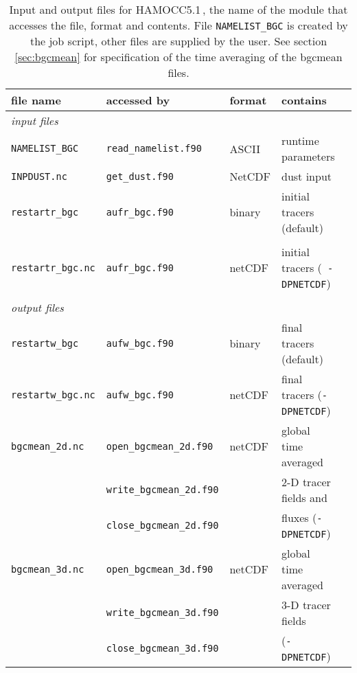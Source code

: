 \documentclass[11pt,a4paper,fleqn,twoside]{article}
\newcommand{\ham}{HAMOCC5.1\,}
\begin{document}
\begin{table}[hbt]
\caption{\label{table_io_files} Input and output files for \ham, the name of
the module that accesses the file, format and contents. File {\tt NAMELIST\_BGC}
is created by the job script, other files are supplied by the user. See section
\ref{sec:bgcmean} for specification of the time averaging of the bgcmean files.} 
\vspace{.2cm}
\begin{center}
\begin{tabular}{lllp{4.5cm}l} \hline
file name & accessed by   & format       & contains    \\ \hline
\multicolumn{4}{l}{\rule{0mm}{4mm}{\it input files}}\\ 
{\tt NAMELIST\_BGC} & {\tt read\_namelist.f90} & ASCII & runtime parameters\\ 
 {\tt INPDUST.nc} & {\tt get\_dust.f90} & NetCDF & dust input \\
 {\tt restartr\_bgc}& {\tt aufr\_bgc.f90} & binary & initial tracers (default)\\
\\ 
 {\tt restartr\_bgc.nc}& {\tt aufr\_bgc.f90} & netCDF & initial tracers ({\tt
 -DPNETCDF})\\
\\ \hline
\multicolumn{4}{l}{\rule{0mm}{4mm}{\it output files}}\\
{\tt restartw\_bgc}& {\tt aufw\_bgc.f90} & binary & final tracers (default)\\
{\tt restartw\_bgc.nc}& {\tt aufw\_bgc.f90} & netCDF & final tracers ({\tt -DPNETCDF})\\

{\tt bgcmean\_2d.nc }& {\tt open\_bgcmean\_2d.f90}  & netCDF & global time averaged    \\
                     & {\tt write\_bgcmean\_2d.f90} &        & 2-D tracer fields and   \\
                     & {\tt close\_bgcmean\_2d.f90} &        & fluxes ({\tt -DPNETCDF})\\


{\tt bgcmean\_3d.nc }& {\tt open\_bgcmean\_3d.f90}  & netCDF & global time averaged    \\
                     & {\tt write\_bgcmean\_3d.f90} &        & 3-D tracer fields       \\
                     & {\tt close\_bgcmean\_3d.f90} &        & ({\tt -DPNETCDF})       \\


\end{tabular}
\end{center}
\end{table}
\end{document}
